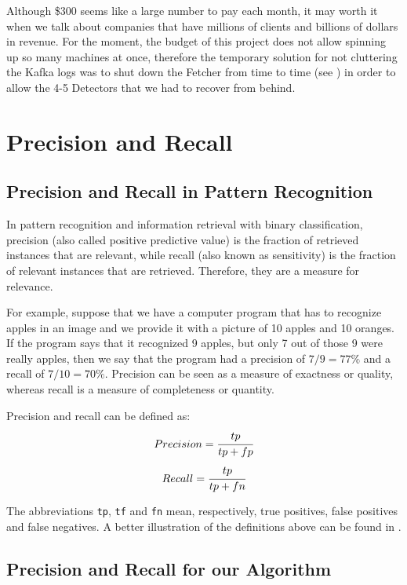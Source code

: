 Although \$300 seems like a large number to pay each month, it may
worth it when we talk about companies that have millions of clients and
billions of dollars in revenue. For the moment, the budget of this project does not allow
spinning up so many machines at once, therefore the temporary solution for not
cluttering the Kafka logs was to shut down the Fetcher from time to time (see
) in
order to allow the 4-5 Detectors that we had to recover from behind.

\section{Precision and Recall}
\label{sec:prec-recall}

\subsection{Precision and Recall in Pattern Recognition}

In pattern recognition and information retrieval with binary classification,
precision (also called positive predictive value) is the fraction of retrieved
instances that are relevant, while recall (also known as sensitivity) is the
fraction of relevant instances that are retrieved. Therefore, they are a
measure for relevance.

For example, suppose that we have a computer program that has to recognize
apples in an image and we provide it with a picture of 10 apples and 10
oranges. If the program says that it recognized 9 apples, but only 7 out of
those 9 were really apples, then we say that the program had a precision of
\(7 / 9 = 77\%\) and a recall of \(7 / 10 = 70\%\). Precision can be seen as a
measure of exactness or quality, whereas recall is a measure of completeness
or quantity.


Precision and recall can be defined as:
\[ Precision = \cfrac{tp}{tp + fp} \]
\[ Recall = \cfrac{tp}{tp + fn} \]

The abbreviations \texttt{tp}, \texttt{tf} and \texttt{fn} mean, respectively,
true positives, false positives and false negatives. A better illustration of
the definitions above can be found in .

\subsection{Precision and Recall for our Algorithm}

